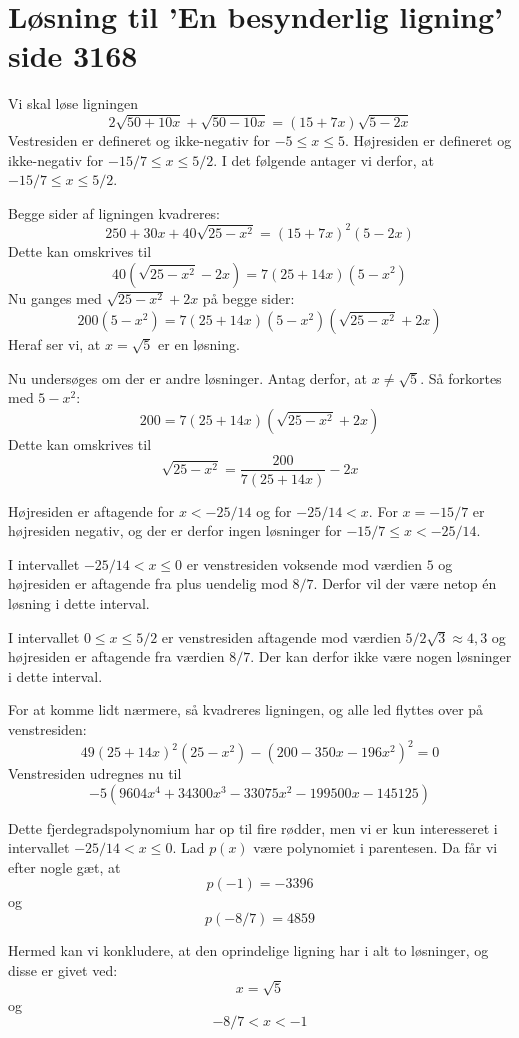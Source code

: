 \documentclass[12pt,oneside,a4paper]{article}
\begin{document}
\section*{Løsning til 'En besynderlig ligning' side 3168}
Vi skal løse ligningen
$$
2\sqrt{50+10x} + \sqrt{50-10x} = (15+7x) \sqrt{5-2x}
$$
Vestresiden er defineret og ikke-negativ for $-5\le x\le 5$. Højresiden er
defineret og ikke-negativ for $-15/7 \le x \le 5/2$. I det følgende antager vi
derfor, at $-15/7 \le x \le 5/2$.

Begge sider af ligningen kvadreres:
$$
250 + 30x + 40\sqrt{25-x^2} = (15+7x)^2(5-2x)
$$
Dette kan omskrives til
$$
40\left(\sqrt{25-x^2}-2x\right) = 7(25+14x)\left(5-x^2\right)
$$
Nu ganges med $\sqrt{25-x^2}+2x$ på begge sider:
$$
200(5-x^2) = 7(25+14x)\left(5-x^2\right)\left(\sqrt{25-x^2}+2x\right)
$$
Heraf ser vi, at $x=\sqrt{5}$ er en løsning.

Nu undersøges om der er andre løsninger.
Antag derfor, at $x\neq \sqrt{5}$. Så forkortes med $5-x^2$:
$$
200 = 7(25+14x)\left(\sqrt{25-x^2}+2x\right)
$$
Dette kan omskrives til
$$
\sqrt{25-x^2} = \frac{200}{7(25+14x)}-2x
$$

Højresiden er aftagende for $x<-25/14$ og for $-25/14<x$.
For $x=-15/7$ er højresiden negativ, og der er derfor ingen løsninger for $-15/7\le x<-25/14$.

I intervallet $-25/14<x\le 0$ er venstresiden voksende mod værdien $5$ og højresiden 
er aftagende fra plus uendelig mod $8/7$. Derfor vil der være netop én løsning
i dette interval.

I intervallet $0\le x \le 5/2$ er venstresiden aftagende mod værdien $5/2 \sqrt{3} \approx 4,\!3$ og højresiden er 
aftagende fra værdien $8/7$. Der kan derfor ikke være nogen løsninger i dette interval.

For at komme lidt nærmere, så kvadreres ligningen, og alle led flyttes over på venstresiden:
$$
49(25+14x)^2(25-x^2) - (200-350x-196x^2)^2 = 0
$$
Venstresiden udregnes nu til
$$
-5\left(9604x^4+34300x^3-33075x^2-199500x-145125\right)
$$

Dette fjerdegradspolynomium har op til fire rødder, men vi er kun interesseret
i intervallet $-25/14<x\le 0$.
Lad $p(x)$ være polynomiet i parentesen. Da får vi efter nogle gæt, at
$$
p(-1) = -3396
$$
og
$$
p(-8/7) = 4859
$$

Hermed kan vi konkludere, at den oprindelige ligning har i alt to løsninger, og disse er givet ved:
$$
x = \sqrt{5}
$$
og
$$
-8/7 < x < -1
$$
\end{document}

